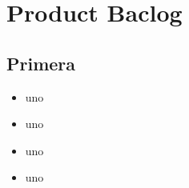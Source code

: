 \chapter{Product Baclog}

\section{Primera}

\begin{itemize}
	\item uno
	\item uno
\end{itemize}

\begin{itemize}	
	\item uno
	\item uno
\end{itemize}
